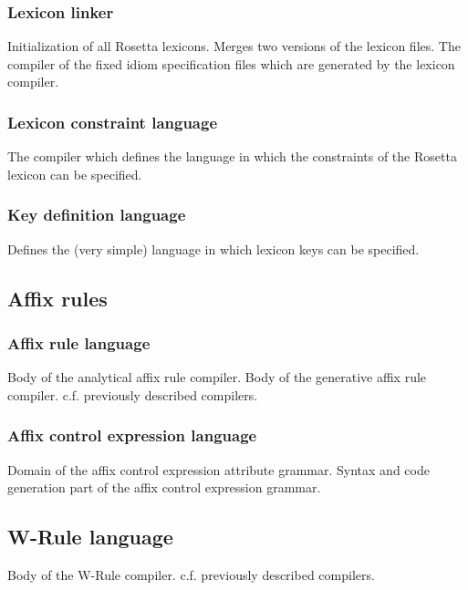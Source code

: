 \subsubsection{Lexicon linker}
\bsc
{} Initialization of all Rosetta lexicons.
 Merges two versions of the lexicon files.
 The compiler of the fixed idiom specification files which
                       are generated by the lexicon compiler.
\esc


\subsubsection{Lexicon constraint language}
\bsc
{} The compiler which defines the language in which the
                     constraints of the Rosetta lexicon can be specified.
\esc
\subsubsection{Key definition language}
\bsc
{} Defines the (very simple) language in which lexicon
                    keys can be specified.
\esc
\subsection{Affix rules}
\subsubsection{Affix rule language}
\bsc
{} Body of the analytical affix rule compiler.
 Body of the generative affix rule compiler.
 c.f. previously described compilers.
\esc
\subsubsection{Affix control expression language}
\bsc
{} Domain of the affix control expression attribute
                         grammar.
 Syntax and code generation part of the affix
                           control expression grammar.
\esc
\subsection{W-Rule language}
\bsc
{} Body of the W-Rule compiler.
 c.f. previously described compilers.
\esc
